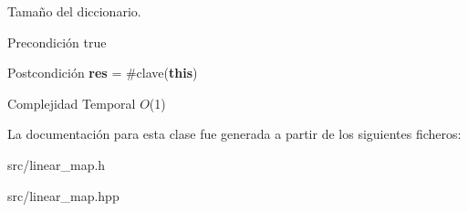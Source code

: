 Tamaño del diccionario. 

\begin{DoxyPrecond}{Precondición}
true 
\end{DoxyPrecond}
\begin{DoxyPostcond}{Postcondición}
{\bfseries res} = \#clave({\bfseries this})
\end{DoxyPostcond}

\begin{DoxyDescription}
\item[Complejidad Temporal]$O$(1)
\end{DoxyDescription}

La documentación para esta clase fue generada a partir de los siguientes ficheros\+:\begin{DoxyCompactItemize}
\item 
src/linear\+\_\+map.\+h\item 
src/linear\+\_\+map.\+hpp\end{DoxyCompactItemize}
